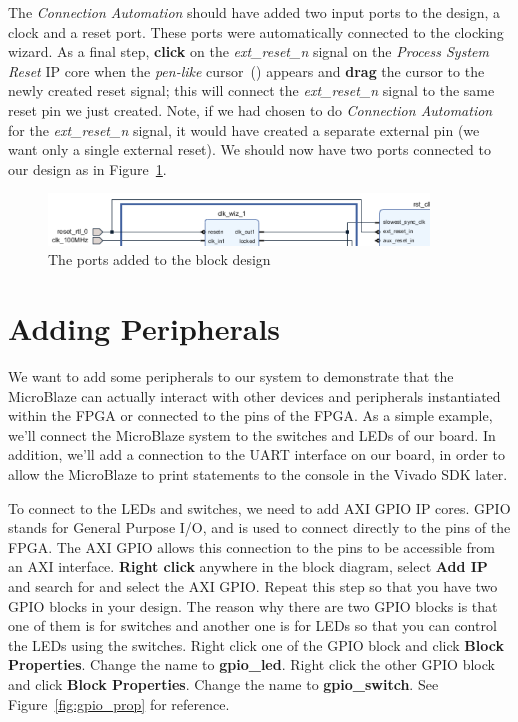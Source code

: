 \documentclass[11pt]{article}
\begin{document}
The \textit{Connection Automation} should have added two input ports to the design, a clock and a reset port. These ports were automatically connected to the clocking wizard. As a final step, \textbf{click} on the \textit{ext\_reset\_n} signal on the \textit{Process System Reset} IP core when the \textit{pen-like} cursor~() appears and \textbf{drag} the cursor to the newly created reset signal; this will connect the \textit{ext\_reset\_n} signal to the same reset pin we just created. Note, if we had chosen to do \textit{Connection Automation} for the \textit{ext\_reset\_n} signal, it would have created a separate external pin (we want only a single external reset). We should now have two ports connected to our design as in Figure~\ref{fig:added_reset_conns}.

\begin{figure}[h]
    \centering
    \includegraphics[width=0.9\textwidth]{images/added_reset_conns.png}
    \caption{The ports added to the block design}
    \label{fig:added_reset_conns}
\end{figure}




\section{Adding Peripherals}
\label{sec:add_periph}
We want to add some peripherals to our system to demonstrate that the MicroBlaze can actually interact with other devices and peripherals instantiated within the FPGA or connected to the pins of the FPGA. As a simple example, we'll connect the MicroBlaze system to the switches and LEDs of our board. In addition, we'll add a connection to the UART interface on our board, in order to allow the MicroBlaze to print statements to the console in the Vivado SDK later.

To connect to the LEDs and switches, we need to add AXI GPIO IP cores. GPIO stands for General Purpose I/O, and is used to connect directly to the pins of the FPGA. The AXI GPIO allows this connection to the pins to be accessible from an AXI interface. \textbf{Right click} anywhere in the block diagram, select \textbf{Add IP} and search for and select the  AXI GPIO. Repeat this step so that you have two GPIO blocks in your design. The reason why there are two GPIO blocks is that one of them is for switches and another one is for LEDs so that you can control the LEDs using the switches. Right click one of the GPIO block and click \textbf{Block Properties}. Change the name to \textbf{gpio\_led}. Right click the other GPIO block and click \textbf{Block Properties}. Change the name to \textbf{gpio\_switch}. See Figure~\ref{fig:gpio_prop} for reference.
\end{document}
